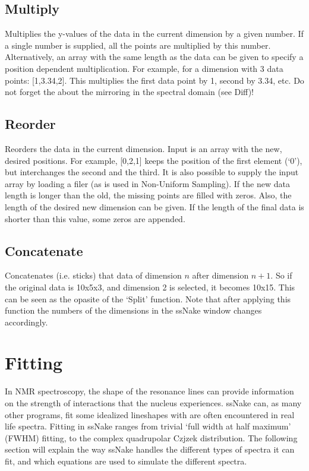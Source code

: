 \documentclass[11pt,a4paper]{article}
\begin{document}
\subsection{Multiply}
Multiplies the y-values of the data in the current dimension by a given number. If a single number is supplied, all the points are multiplied by this number. Alternatively, an array with the same length as the data can be given to specify a position dependent multiplication. For example, for a dimension with 3 data points: [1,3.34,2]. This multiplies the first data point by 1, second by 3.34, etc. Do not forget the about the mirroring in the spectral domain (see Diff)!

\subsection{Reorder}
Reorders the data in the current dimension. Input is an array with the new, desired positions. For example, [0,2,1] keeps the position of the first element (`0'), but interchanges the second and the third. It is also possible to supply the input array by loading a filer (as is used in Non-Uniform Sampling). If the new data length is longer than the old, the missing points are filled with zeros. Also, the length of the desired new dimension can be given. If the length of the final data is shorter than this value, some zeros are appended.

\subsection{Concatenate}
Concatenates (i.e. sticks) that data of dimension $n$ after dimension $n+1$. So if the original data is 10x5x3, and dimension 2 is selected, it becomes 10x15. This can be seen as the opasite of the `Split' function. Note that after applying this function the numbers of the dimensions in the ssNake window changes accordingly.



\section{Fitting}
In NMR spectroscopy, the shape of the resonance lines can provide information on the strength of interactions that the nucleus experiences. ssNake can, as many other programs, fit some idealized lineshapes with are often encountered in real life spectra. Fitting in ssNake ranges from trivial `full width at half maximum' (FWHM) fitting, to the complex quadrupolar Czjzek distribution. The following section will explain the way ssNake handles the different types of spectra it can fit, and which equations are used to simulate the different spectra.
\end{document}
